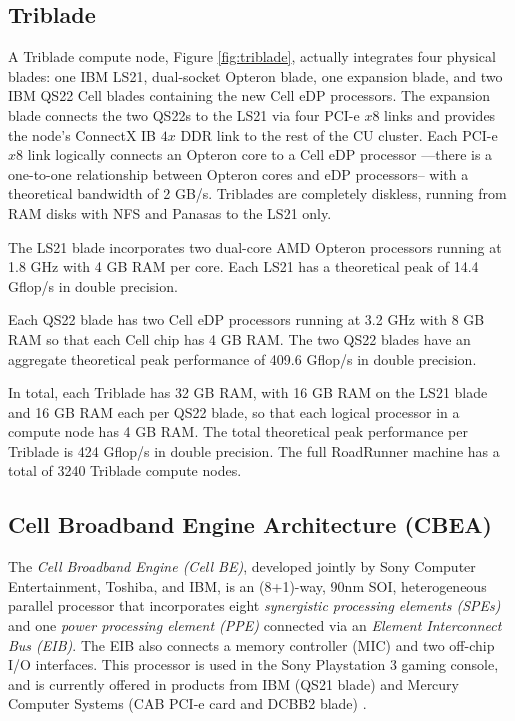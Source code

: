 \documentclass[letter,10pt]{article}
\begin{document}
\subsection*{Triblade}

A Triblade compute node, Figure \ref{fig:triblade}, actually integrates
four physical blades: one IBM LS21, dual-socket Opteron blade, one
expansion blade, and two IBM QS22 Cell blades containing the new
Cell eDP processors.  The expansion blade connects the two QS22s to
the LS21 via four PCI-e $x8$ links and provides the node's
ConnectX IB $4x$ DDR link to the rest of the CU cluster.
Each PCI-e $x8$ link logically connects an Opteron core to a
Cell eDP processor ---there is a one-to-one relationship between
Opteron cores and eDP processors-- with a theoretical bandwidth
of 2 GB/s.  Triblades are completely diskless, running from RAM disks
with NFS and Panasas \cite{panasas} to the LS21 only.

The LS21 blade incorporates two dual-core AMD Opteron processors
running at 1.8 GHz with 4 GB RAM per core.  Each LS21 has a
theoretical peak of 14.4 Gflop/s in double precision.

Each QS22 blade has two Cell eDP processors running at 3.2 GHz
with 8 GB RAM so that each Cell chip has 4 GB RAM.  The two QS22
blades have an aggregate theoretical peak performance of
409.6 Gflop/s in double precision.

In total, each Triblade has 32 GB RAM, with 16 GB RAM on the
LS21 blade and 16 GB RAM each per QS22 blade, so that each
logical processor in a compute node has 4 GB RAM.  The total
theoretical peak performance per Triblade is 424 Gflop/s in
double precision.  The full RoadRunner machine has a total of
3240 Triblade compute nodes.

\subsection*{Cell Broadband Engine Architecture (CBEA)}


The \emph{Cell Broadband Engine (Cell BE)}, developed jointly by Sony
Computer Entertainment, Toshiba, and IBM, is an (8+1)-way, 90nm SOI,
heterogeneous parallel processor that incorporates eight
\emph{synergistic processing elements (SPEs)} and one
\emph{power processing element (PPE)} connected via an
\emph{Element Interconnect Bus (EIB)}.  The EIB also connects
a memory controller (MIC) and two off-chip I/O interfaces.
This processor is used in the Sony Playstation 3 gaming console,
and is currently offered in products from IBM (QS21 blade)
and Mercury Computer Systems
(CAB PCI-e card and DCBB2 blade) \cite{mercury}.
\end{document}
